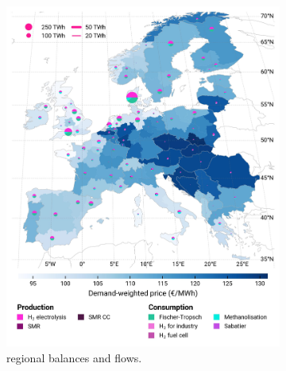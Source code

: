 \documentclass[preprint,12pt,sort&compress]{elsarticle}
\begin{document}
\begin{figure}[htbp]
  \centering
  \begin{subfigure}[t]{0.49\textwidth}
      \vspace{0pt}
      \includegraphics[width=1\textwidth]{maps/no-pipelines-no-pcipmi/base_s_adm___2040-balance_map_H2}
      \vspace{-0.5cm}
      \caption{ regional balances and flows.}
      \label{fig:DI_lt_2040_h2}
  \end{subfigure}
  \hfill
  \begin{subfigure}[t]{0.49\textwidth}
      \vspace{0pt}

\end{subfigure}
\end{figure}
\end{document}
